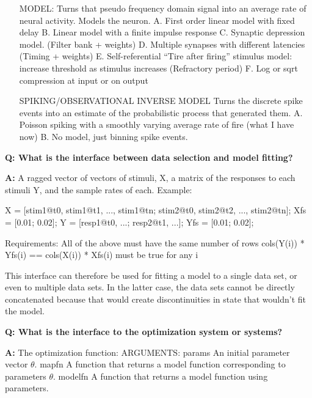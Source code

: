 \documentclass{article}
\newenvironment{qanda}{\setlength{\parindent}{0pt}}{\bigskip}
\newcommand{\Q}{\bigskip\bfseries Q: }
\newcommand{\A}{\par\textbf{A:} \normalfont}
\begin{document}
\begin{qanda}
\begin{enumerate}
       RETURNS:
           $Z$    1xM vector that is the filter's response
           $T_Z$  Filtered stimulus sampling interval [s]
   
   Prefilter creation functions $P$ accept model parameters $\theta$ that define precisely how the stimulus is filtered. If you wish to treat this as a hyperparameter, you may set it.

   \item [MODEL:] Turns that pseudo frequency domain signal into an average rate of neural activity. Models the neuron. 
      A. First order linear model with fixed delay
      B. Linear model with a finite impulse response
      C. Synaptic depression model. (Filter bank + weights)
      D. Multiple synapses with different latencies (Timing + weights)
      E. Self-referential ``Tire after firing'' stimulus model: increase threshold as stimulus increases (Refractory period)
      F. Log or sqrt compression at input or on output
      
   \item [SPIKING/OBSERVATIONAL INVERSE MODEL] Turns the discrete spike events into an estimate of the probabilistic process that generated them. 
      A. Poisson spiking with a smoothly varying average rate of fire (what I have now)
      B. No model, just binning spike events.
      \end{enumerate}

\Q What is the interface between data selection and model fitting?
\A A ragged vector of vectors of stimuli, X, a matrix of the responses to each stimuli Y, and the sample rates of each. Example:

   X = [stim1@t0, stim1@t1, ..., stim1@tn;
        stim2@t0, stim2@t2, ..., stim2@tn];
   Xfs = [0.01;  %
         0.02]; %
   Y = [resp1@t0, ...; 
     resp2@t1, ...]; 
   Yfs = [0.01; %
          0.02];

   Requirements:
       All of the above must have the same number of rows
       cols(Y(i)) * Yfs(i) == cols(X(i)) * Xfs(i) must be true for any i

   This interface can therefore be used for fitting a model to a single data set, or even to multiple data sets. In the latter case, the data sets cannot be directly concatenated because that would create discontinuities in state that wouldn't fit the model. 

\Q What is the interface to the optimization system or systems?
\A The optimization function:
   ARGUMENTS: 
     params      An initial parameter vector $\theta$.
     mapfn       A function that returns a model function corresponding to parameters $\theta$. 
     modelfn     A function that returns a model function using parameters. 
     

\end{qanda}
\end{document}
